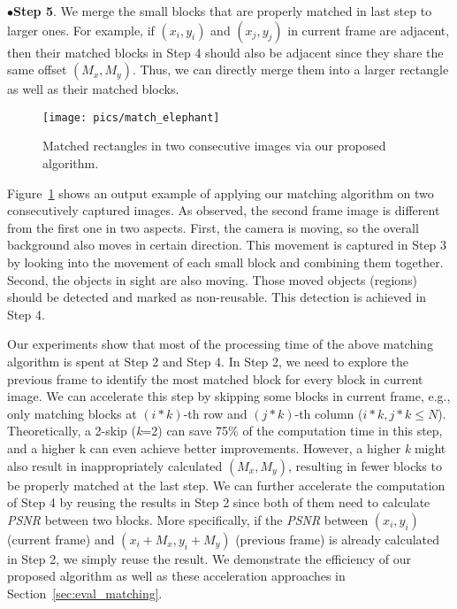 \documentclass[10pt,acmtog]{acmart}
\begin{document}
\noindent$\bullet$\textbf{Step 5}. We merge the small blocks that are properly matched in last step to larger ones.
For example, if $(x_i,y_i)$ and $(x_j,y_j)$ in current frame are adjacent, then their matched blocks in Step 4 should also be adjacent since they share the same offset $(M_x,M_y)$.
Thus, we can directly merge them into a larger rectangle as well as their matched blocks.

\begin{figure}[t]
	\centering
	\texttt{[image: pics/match\_elephant]}
	\caption{Matched rectangles in two consecutive images via our proposed algorithm.}
	\label{fig:match_elephant}
\end{figure}

Figure~\ref{fig:match_elephant} shows an output example of applying our matching algorithm on two consecutively captured images.
As observed, the second frame image is different from the first one in two aspects.
First, the camera is moving, so the overall background also moves in certain direction.
This movement is captured in Step 3 by looking into the movement of each small block and combining them together.
Second, the objects in sight are also moving.
Those moved objects (regions) should be detected and marked as non-reusable.
This detection is achieved in Step 4.

Our experiments show that most of the processing time of the above matching algorithm is spent at Step 2 and Step 4.
In Step 2, we need to explore the previous frame to identify the most matched block for every block in current image.
We can accelerate this step by skipping some blocks in current frame, e.g., only matching blocks at $(i*k)$-th row and $(j*k)$-th column ($i*k,j*k\leqslant N$).
Theoretically, a 2-skip (\emph{k}=2) can save 75\% of the computation time in this step, and a higher k can even achieve better improvements.
However, a higher \emph{k} might also result in inappropriately calculated $(M_x,M_y)$, resulting in fewer blocks to be properly matched at the last step.
We can further accelerate the computation of Step 4 by reusing the results in Step 2 since both of them need to calculate \emph{PSNR} between two blocks.
More specifically, if the \emph{PSNR} between $(x_i,y_i)$ (current frame) and $(x_i+M_x,y_i+M_y)$ (previous frame) is already calculated in Step 2, we simply reuse the result.
We demonstrate the efficiency of our proposed algorithm as well as these acceleration approaches in Section~\ref{sec:eval_matching}.
\end{document}
